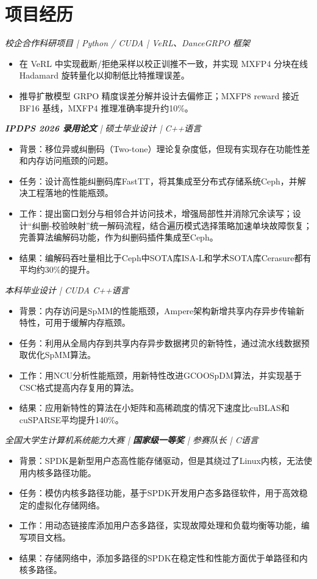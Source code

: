 
\section{项目经历}
\textit{校企合作科研项目 | Python / CUDA | VeRL、DanceGRPO 框架}
\begin{itemize}
  \item 在 VeRL 中实现截断/拒绝采样以校正训推不一致，并实现 MXFP4 分块在线 Hadamard 旋转量化以抑制低比特推理误差。
  \item 推导扩散模型 GRPO 精度误差分解并设计去偏修正；MXFP8 reward 接近 BF16 基线，MXFP4 推理准确率提升约10\%。
\end{itemize}
\textit{\textbf{IPDPS 2026 录用论文} | 硕士毕业设计 | C++语言}
\begin{itemize}
\item 背景：移位异或纠删码（Two-tone）理论复杂度低，但现有实现存在功能性差和内存访问瓶颈的问题。
\item 任务：设计高性能纠删码库FastTT，将其集成至分布式存储系统Ceph，并解决工程落地的性能瓶颈。
\item 工作：提出窗口划分与相邻合并访问技术，增强局部性并消除冗余读写；设计“纠删-校验映射”统一解码流程，结合遍历模式选择策略加速单块故障恢复；完善算法编解码功能，作为纠删码插件集成至Ceph。
\item 结果：编解码吞吐量相比于Ceph中SOTA库ISA-L和学术SOTA库Cerasure都有平均约30\%的提升。
\end{itemize}
\textit{本科毕业设计 | CUDA C++语言}
\begin{itemize}
  \item 背景：内存访问是SpMM的性能瓶颈，Ampere架构新增共享内存异步传输新特性，可用于缓解内存瓶颈。
  \item 任务：利用从全局内存到共享内存异步数据拷贝的新特性，通过流水线数据预取优化SpMM算法。
  \item 工作：用NCU分析性能瓶颈，用新特性改进GCOOSpDM算法，并实现基于CSC格式提高内存复用的算法。
  \item 结果：应用新特性的算法在小矩阵和高稀疏度的情况下速度比cuBLAS和cuSPARSE平均提升140\%。
\end{itemize}
\textit{全国大学生计算机系统能力大赛 | \textbf{国家级一等奖} | 参赛队长 | C语言}
\begin{itemize}
  \item 背景：SPDK是新型用户态高性能存储驱动，但是其绕过了Linux内核，无法使用内核多路径功能。
  \item 任务：模仿内核多路径功能，基于SPDK开发用户态多路径软件，用于高效稳定的虚拟化存储网络。
  \item 工作：用动态链接库添加用户态多路径，实现故障处理和负载均衡等功能，编写项目文档。
  \item 结果：存储网络中，添加多路径的SPDK在稳定性和性能方面优于单路径和内核多路径。
\end{itemize}
